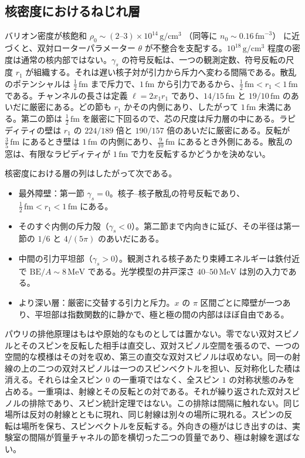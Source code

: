 \documentclass[a4paper]{article}
\begin{document}
\subsection{核密度におけるねじれ層}

バリオン密度が核飽和
\(\rho_0\sim (2\text{--}3)\times 10^{14}\,\mathrm{g/cm^3}\)
（同等に \(n_0\sim 0.16\,\mathrm{fm}^{-3}\)）
に近づくと、双対ローターパラメーター \(\theta\) が不整合を支配する。\(10^{18}\,\mathrm{g/cm^3}\) 程度の密度は通常の核内部ではない。\(\gamma_s\) の符号反転は、一つの観測定数、符号反転の尺度 \(r_1\) が組織する。それは遅い核子対が引力から斥力へ変わる間隔である。散乱のポテンシャルは \(\tfrac12\,\mathrm{fm}\) まで斥力で、\(1\,\mathrm{fm}\) から引力であるから、\(\tfrac12\,\mathrm{fm}<r_1<1\,\mathrm{fm}\) である。チャンネルの長さは定義 \(\ell=2x_1 r_1\) であり、\(14/15\,\mathrm{fm}\) と \(19/10\,\mathrm{fm}\) のあいだに厳密にある。どの節も \(r_1\) かその内側にあり、したがって \(1\,\mathrm{fm}\) 未満にある。第二の節は \(\tfrac12\,\mathrm{fm}\) を厳密に下回るので、芯の尺度は斥力層の中にある。ラピディティの壁は \(r_1\) の \(224/189\) 倍と \(190/157\) 倍のあいだに厳密にある。反転が \(\tfrac35\,\mathrm{fm}\) にあるとき壁は \(1\,\mathrm{fm}\) の内側にあり、\(\tfrac9{10}\,\mathrm{fm}\) にあるとき外側にある。散乱の窓は、有限なラピディティが \(1\,\mathrm{fm}\) で力を反転するかどうかを決めない。

核密度における層の列はしたがって次である。

\begin{itemize}
\item 最外障壁：第一節 \(\gamma_s=0\)。核子--核子散乱の符号反転であり、\(\tfrac12\,\mathrm{fm}<r_1<1\,\mathrm{fm}\) にある。
\item そのすぐ内側の斥力殻（\(\gamma_s<0\)）。第二節まで内向きに延び、その半径は第一節の \(1/6\) と \(4/(5\pi)\) のあいだにある。
\item 中間の引力平坦部（\(\gamma_s>0\)）。観測される核子あたり束縛エネルギーは鉄付近で \(\mathrm{BE}/A\sim 8\,\mathrm{MeV}\) である。光学模型の井戸深さ \(40\)--\(50\,\mathrm{MeV}\) は別の入力である。
\item より深い層：厳密に交替する引力と斥力。\(x\) の \(\pi\) 区間ごとに障壁が一つあり、平坦部は指数関数的に静かで、極と極の間の内部はほぼ自由である。
\end{itemize}

パウリの排他原理はもはや原始的なものとしては置かない。零でない双対スピノルとそのスピンを反転した相手は直交し、双対スピノル空間を張るので、一つの空間的な模様はその対を収め、第三の直交な双対スピノルは収めない。同一の射線の上の二つの双対スピノルは一つのスピンベクトルを担い、反対称化した積は消える。それらは全スピン $0$ の一重項ではなく、全スピン $1$ の対称状態のみを占める。一重項は、射線とその反転との対である。それが繰り返された双対スピノルの排除であり、スピン統計定理ではない。この排除は間隔に触れない。同じ場所は反対の射線とともに現れ、同じ射線は別々の場所に現れる。スピンの反転は場所を保ち、スピンベクトルを反転する。外向きの極がはじき出すのは、実験室の間隔が質量チャネルの節を横切った二つの質量であり、極は射線を選ばない。
\end{document}
